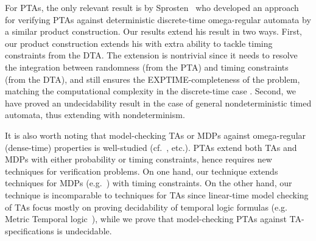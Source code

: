 For PTAs, the only relevant result is by Sprosten~\cite{DBLP:conf/qest/Sproston11} who developed an approach for verifying PTAs against deterministic discrete-time omega-regular automata by a similar product construction.
Our results extend his result in two ways.
First, our product construction extends his with extra ability to tackle timing constraints from the DTA.
The extension is nontrivial since it needs to resolve the integration between randomness (from the PTA) and timing constraints (from the DTA), and still ensures the EXPTIME-completeness of the problem, matching the computational complexity in the discrete-time case \cite{DBLP:conf/qest/Sproston11}.
Second, we have proved an undecidability result in the case of general nondeterministic timed automata, thus extending \cite{DBLP:conf/qest/Sproston11} with nondeterminism.

It is also worth noting that model-checking TAs or MDPs against omega-regular (dense-time) properties is well-studied (cf.~\cite{DBLP:books/daglib/0020348,DBLP:conf/lics/OuaknineW05,DBLP:conf/arts/Vardi99}, etc.).
PTAs extend both TAs and MDPs with either probability or timing constraints,
hence requires new techniques for verification problems.
On one hand, our technique extends techniques for MDPs (e.g.~\cite{DBLP:conf/arts/Vardi99}) with timing constraints.
On the other hand, our technique is incomparable to techniques for TAs since linear-time model checking of TAs focus mostly on proving decidability of temporal logic formulas (e.g. Metric Temporal logic~\cite{DBLP:journals/rts/Koymans90,DBLP:journals/jacm/AlurFH96,DBLP:conf/lics/OuaknineW05}),
while we prove that model-checking PTAs against TA-specifications is undecidable.

